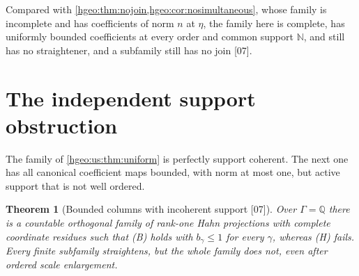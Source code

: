 \documentclass[11pt,letterpaper]{article}
\numberwithin{equation}{section}
\newtheorem{theorem}{Theorem}[section]
\theoremstyle{definition}
\theoremstyle{remark}
\newcommand{\Q}{\mathbb Q}
\newcommand{\N}{\mathbb N}
\newcommand{\src}[1]{\textup{\textsf{\small[#1]}}}
\begin{document}
Compared with \cref{hgeo:thm:nojoin,hgeo:cor:nosimultaneous}, whose family is
incomplete and has coefficients of norm $n$ at $\eta$, the family here is
complete, has uniformly bounded coefficients at every order and common support
$\N$, and still has no straightener, and a subfamily still has no join
\src{07}.

\section{The independent support obstruction}\label{hgeo:us:sec:support}

The family of \cref{hgeo:us:thm:uniform} is perfectly support coherent. The
next one has all canonical coefficient maps bounded, with norm at most one,
but active support that is not well ordered.

\begin{theorem}[Bounded columns with incoherent support \src{07}]
\label{hgeo:us:thm:support}
Over $\Gamma=\Q$ there is a countable orthogonal family of rank-one Hahn
projections with complete coordinate residues such that \textup{(B)} holds
with $b_\gamma\le1$ for every $\gamma$, whereas \textup{(H)} fails. Every
finite subfamily straightens, but the whole family does not, even after
ordered scale enlargement.
\end{theorem}
\end{document}

